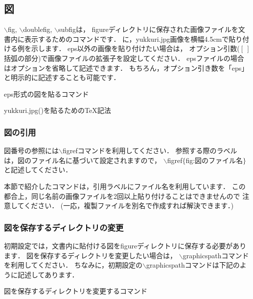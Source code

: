 \subsection{図}
$\backslash$fig, $\backslash$doublefig, $\backslash$subfigは，
figureディレクトリに保存された画像ファイルを文書内に表示するためのコマンドです．
に，yukkuri.jpg画像を横幅4.5cmで貼り付ける例を示します．
eps以外の画像を貼り付けたい場合は，
オプション引数($[\ ]$括弧の部分)で画像ファイルの拡張子を設定してください．
epsファイルの場合はオプションを省略して記述できます．
もちろん，オプション引き数を「eps」と明示的に記述することも可能です．
%
\begin{lstbox}{eps形式の図を貼るコマンド}
\begin{minilst}


\end{minilst}
\end{lstbox}
%
%
\begin{lstbox}{yukkuri.jpg()を貼るためのTeX記法}
\begin{minilst}
\end{minilst}
\end{lstbox}

\subsubsection{図の引用}
図番号の参照には$\backslash$figrefコマンドを利用してください．
参照する際のラベルは，図のファイル名に基づいて設定されますので，
$\backslash$figref$\{$fig:図のファイル名$\}$と記述してください．

本節で紹介したコマンドは，引用ラベルにファイル名を利用しています．
この都合上，同じ名前の画像ファイルを2回以上貼り付けることはできませんので
注意してください．
(一応，複製ファイルを別名で作成すれば解決できます．)


\subsubsection{図を保存するディレクトリの変更}
初期設定では，文書内に貼付ける図をfigureディレクトリに保存する必要があります．
図を保存するディレクトリを変更したい場合は，
$\backslash$graphicspathコマンドを利用してください．
ちなみに，初期設定の$\backslash$graphicspathコマンドは下記のように記述してあります．
\begin{lstbox}{図を保存するディレクトリを変更するコマンド}
\begin{minilst}
\graphicspath{{./figure/}}
\end{minilst}
\end{lstbox}
